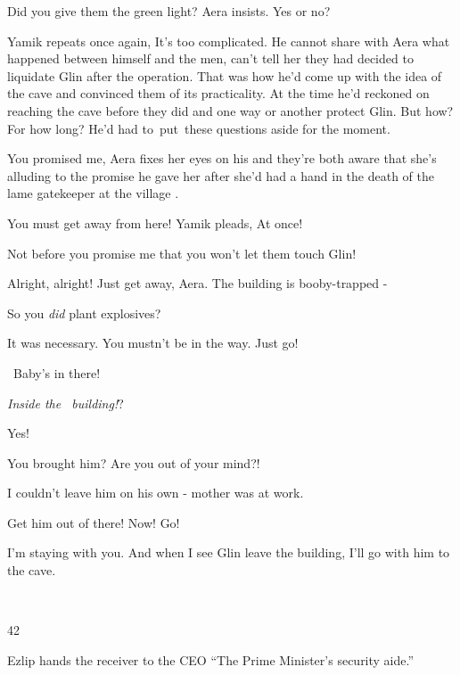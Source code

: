 \documentclass[letterpaper]{article}
\begin{document}
{\textquotedbl}Did you give them the green light?{\textquotedbl} Aera insists. {\textquotedbl}Yes or no?{\textquotedbl} 

Yamik repeats once again, {\textquotedbl}It's too complicated.{\textquotedbl} He
cannot{ }share with Aera what happened between himself and the men, can't tell
her they had decided to liquidate Glin after the operation. That was how he'd come up with the idea of the cave and
convinced them of its practicality. At the time he'd reckoned on reaching the cave before they did and one way or
another protect Glin. But how? For how long? He'd had to~put~these questions aside for the moment. 

{\textquotedbl}You promised me,{\textquotedbl} Aera fixes her eyes on his and they're both aware that she's alluding to
the promise he gave her after she'd had a hand in the death of the lame gatekeeper at the village .

{\textquotedbl}You must get away from here!{\textquotedbl} Yamik pleads, {\textquotedbl}At
once!{\textquotedbl}~~~~~~~~~~~ 

{\textquotedbl}Not before you promise me that you won't let them touch Glin!{\textquotedbl} 

{\textquotedbl}Alright, alright! Just get away, Aera{. T}he building is
booby-trapped -{\textquotedbl} 

{\textquotedbl}So you \textit{did}{ }plant explosives?{\textquotedbl} 

{\textquotedbl}{I}t was{ }necessary. You
mustn't be in the way. Just go!{\textquotedbl}

~{\textquotedbl}Baby's in there!{\textquotedbl} 

{\textquotedbl}\textit{Inside the~ building!}?{\textquotedbl} 

{\textquotedbl}Yes!{\textquotedbl} 

{\textquotedbl}You brought him? Are you out of your mind?!{\textquotedbl} 

{\textquotedbl}I couldn't leave him on his own {{}-} mother was at
work.{\textquotedbl} 

{\textquotedbl}Get him out of there! Now! Go!{\textquotedbl} 

{\textquotedbl}I'm staying with you. And when I see Glin leave the building, I'll go with him to the
cave.{\textquotedbl} 

~

42 

Ezlip hands the receiver to the CEO ``The Prime Minister's security aide.'' 
\end{document}
